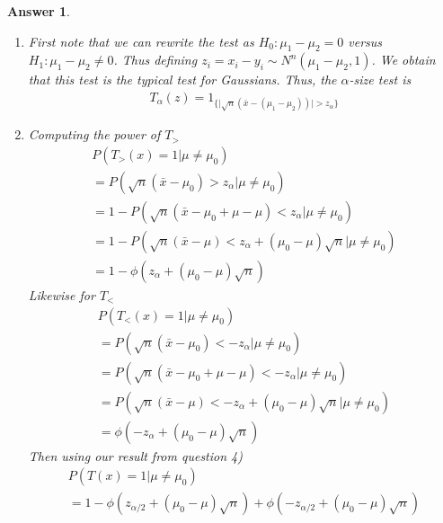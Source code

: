 \documentclass[12pt]{article}
\theoremstyle{colon}
\newtheorem*{answer}{Answer}
\begin{document}
\begin{answer}
  \leavevmode
  \begin{enumerate}[label=\arabic*)]
    \item First note that we can rewrite the test as $H_0 : \mu_1 - \mu_2 = 0$ versus $H_1 : \mu_1 - \mu_2 \neq 0$. Thus defining $z_i = x_i - y_i \sim N^n(\mu_1 - \mu_2, 1)$. We obtain that this test is the typical test for Gaussians. Thus, the $\alpha$-size test is
      \begin{gather*}
        T_\alpha(z) = 1_{\{ \lvert \sqrt{n}(\bar{x} - (\mu_1 - \mu_2)) \rvert > z_\alpha \}}
      \end{gather*}
    \item Computing the power of $T_>$
      \begin{gather*}
        P(T_>(x) = 1 | \mu \neq \mu_0) \\
        = P( \sqrt{n}(\bar{x} - \mu_0) > z_{\alpha} | \mu \neq \mu_0) \\
        = 1 - P(\sqrt{n}(\bar{x} - \mu_0 + \mu - \mu) < z_{\alpha} | \mu \neq \mu_0) \\
        = 1 - P(\sqrt{n}(\bar{x} - \mu)  < z_{\alpha} + (\mu_0-\mu) \sqrt{n} | \mu \neq \mu_0) \\
        = 1 - \phi(z_{\alpha} + (\mu_0-\mu) \sqrt{n})
      \end{gather*}
      Likewise for $T_<$
      \begin{gather*}
        P(T_<(x) = 1 | \mu \neq \mu_0) \\
        = P( \sqrt{n}(\bar{x} - \mu_0) < -z_{\alpha} | \mu \neq \mu_0) \\
        = P(\sqrt{n}(\bar{x} - \mu_0 + \mu - \mu) < -z_{\alpha} | \mu \neq \mu_0) \\
        = P(\sqrt{n}(\bar{x} - \mu)  < -z_{\alpha} + (\mu_0-\mu) \sqrt{n} | \mu \neq \mu_0) \\
        = \phi(-z_{\alpha} + (\mu_0-\mu) \sqrt{n})
      \end{gather*}
      Then using our result from question 4)
      \begin{gather*}
        P(T(x) = 1 | \mu \neq \mu_0) \\
        = 1 - \phi(z_{\alpha/2} + (\mu_0-\mu) \sqrt{n}) + \phi(-z_{\alpha/2} + (\mu_0-\mu) \sqrt{n})
      \end{gather*}
  \end{enumerate}
\end{answer}

\clearpage
\end{document}
